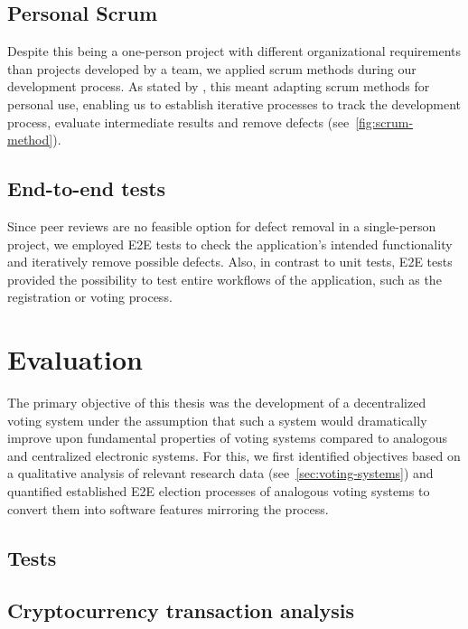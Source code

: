\subsection{Personal Scrum}\label{subsec:personal-scrum}

Despite this being a one-person project with different organizational requirements than projects developed by a team, we applied scrum methods during our development process.
As stated by \textcites{andrews_scrum_2017}{pahuja_scrum_2015}, this meant adapting scrum methods for personal use, enabling us to establish iterative processes to track the development process, evaluate intermediate results and remove defects (see~\cref{fig:scrum-method}).

\subsection{End-to-end tests}\label{subsec:end-to-end-tests}

Since peer reviews are no feasible option for defect removal in a single-person project, we employed E2E tests to check the application’s intended functionality and iteratively remove possible defects.
Also, in contrast to unit tests, \gls{E2E} tests provided the possibility to test entire workflows of the application, such as the registration or voting process.

\section{Evaluation}\label{sec:evaluation}

The primary objective of this thesis was the development of a decentralized voting system under the assumption that such a system would dramatically improve upon fundamental properties of voting systems compared to analogous and centralized electronic systems.
For this, we first identified objectives based on a qualitative analysis of relevant research data (see~\cref{sec:voting-systems}) and quantified established \gls{E2E} election processes of analogous voting systems to convert them into software features mirroring the process.


\subsection{Tests}\label{subsec:tests}
\subsection{Cryptocurrency transaction analysis}\label{subsec:crypto-currency-transaction-analysis}